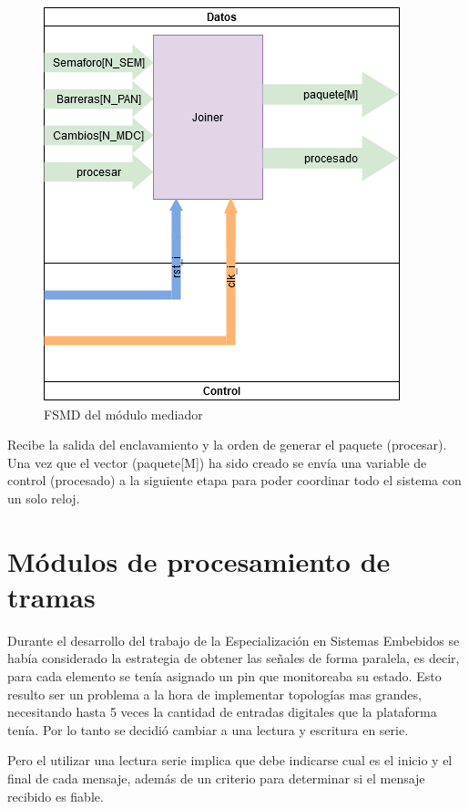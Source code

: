 		\begin{figure}[h]
		\centering
			\includegraphics[scale=.5]{./Figures/FSMD-Mediador}
			\caption{FSMD del módulo mediador}
			\label{fig:FSMD_Mediador}
		\end{figure}
		
		Recibe la salida del enclavamiento y la orden de generar el paquete (procesar). Una vez que el vector (paquete[M]) ha sido creado se envía una variable de control (procesado) a la siguiente etapa para poder coordinar todo el sistema con un solo reloj.
		
\section{Módulos de procesamiento de tramas}

	Durante el desarrollo del trabajo de la Especialización en Sistemas Embebidos se había considerado la estrategia de obtener las señales de forma paralela, es decir, para cada elemento se tenía asignado un pin que monitoreaba su estado. Esto resulto ser un problema a la hora de implementar topologías mas grandes, necesitando hasta 5 veces la cantidad de entradas digitales que la plataforma tenía. Por lo tanto se decidió cambiar a una lectura y escritura en serie.
	
	Pero el utilizar una lectura serie implica que debe indicarse cual es el inicio y el final de cada mensaje, además de un criterio para determinar si el mensaje recibido es fiable.
	
